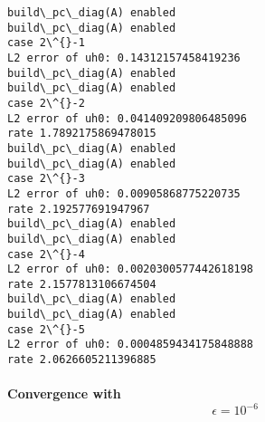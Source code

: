 \documentclass[11pt]{article}
\begin{document}
    \begin{Verbatim}[commandchars=\\\{\}]
build\_pc\_diag(A) enabled
build\_pc\_diag(A) enabled
case 2\^{}-1
L2 error of uh0: 0.14312157458419236
build\_pc\_diag(A) enabled
build\_pc\_diag(A) enabled
case 2\^{}-2
L2 error of uh0: 0.041409209806485096
rate 1.7892175869478015
build\_pc\_diag(A) enabled
build\_pc\_diag(A) enabled
case 2\^{}-3
L2 error of uh0: 0.00905868775220735
rate 2.192577691947967
build\_pc\_diag(A) enabled
build\_pc\_diag(A) enabled
case 2\^{}-4
L2 error of uh0: 0.0020300577442618198
rate 2.1577813106674504
build\_pc\_diag(A) enabled
build\_pc\_diag(A) enabled
case 2\^{}-5
L2 error of uh0: 0.0004859434175848888
rate 2.0626605211396885
    \end{Verbatim}

    \paragraph{\texorpdfstring{Convergence with
\[\epsilon = 10^{-6}\]}{Convergence with \textbackslash{}epsilon = 10\^{}\{-6\}}}\label{convergence-with-epsilon-10-6}
\end{document}
